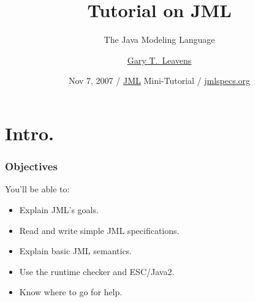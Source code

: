 \newcommand{\join}{\ensuremath{\sqcup}}
\newcommand{\bigjoin}{\ensuremath{\bigsqcup}}
\newcommand{\refines}{\ensuremath{\sqsupseteq}}
\newcommand{\supers}{\textit{supers}}
\newcommand{\methods}{\textit{methods}}

\newcommand{\true}{\mbox{\textit{true}}}
\newcommand{\false}{\mbox{\textit{false}}}

\newcommand{\oa}{\texttt{\textbackslash{\textbf{only\_assigned}}}}
\newcommand{\At}{\triangleright}
\newcommand{\Spec}[1]{\textrm{Spec}(#1)}
\newcommand{\Proves}{\:\: \vdash \:\:}

\title[JML Mini-Tutorial]{Tutorial on JML}
\subtitle{The Java Modeling Language}

\author[Gary T. Leavens] %
{\href{http://www.eecs.ucf.edu/~leavens/}{Gary T.~Leavens}}

\date[Fall 2007]{Nov 7, 2007 / \href{http://www.jmlspecs.org/}{JML} Mini-Tutorial / \href{http://www.jmlspecs.org}{jmlspecs.org}}

\subject{JML} %





\begin{frame}
  \titlepage
\end{frame}

\section*{Intro.}

\begin{frame}
\frametitle{Objectives}

You'll be able to:
  \begin{itemize}
  \item
    Explain JML's goals.
  \item
    Read and write simple JML specifications.
  \item
    Explain basic JML semantics.
  \item
    Use the runtime checker and ESC/Java2.
  \item
    Know where to go for help.
  \end{itemize}
\end{frame}


